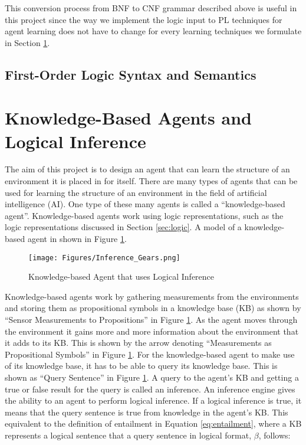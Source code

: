 This conversion process from BNF to CNF grammar described above is useful in this project since the way we implement the logic input to PL techniques for agent learning does not have to change for every learning techniques we formulate in Section \ref{sec:kb_agents_and_logical_inference}.

\subsection{First-Order Logic Syntax and Semantics}
\label{subsec: fol_logic}


\newpage

\section{Knowledge-Based Agents and Logical Inference}
\label{sec:kb_agents_and_logical_inference}

The aim of this project is to design an agent that can learn the structure of an environment it is placed in for itself. There are many types of agents that can be used for learning the structure of an environment in the field of artificial intelligence (AI). One type of these many agents is called a ``knowledge-based agent''. 
Knowledge-based agents work using logic representations, such as the logic representations discussed in Section \ref{sec:logic}.
A model of a knowledge-based agent in shown in Figure \ref{fig:kb_agent}. 

\begin{figure}[H]
    \centering
    \texttt{[image: Figures/Inference\_Gears.png]}
    \caption{Knowledge-based Agent that uses Logical Inference}
    \label{fig:kb_agent}
\end{figure}




Knowledge-based agents work by gathering measurements from the environments and storing them as propositional symbols in a knowledge base (KB) as shown by ``Sensor Measurements to Propositions'' in Figure \ref{fig:kb_agent}. As the agent moves through the environment it gains more and more information about the environment that it adds to its KB. This is shown by the arrow denoting ``Measurements as Propositional Symbols'' in Figure \ref{fig:kb_agent}. For the knowledge-based agent to make use of its knowledge base, it has to be able to query its knowledge base. This is shown as ``Query Sentence'' in Figure \ref{fig:kb_agent}. A query to the agent's KB and getting a true or false result for the query is called an inference. An inference engine gives the ability to an agent to perform logical inference. If a logical inference is true, it means that the query sentence is true from knowledge in the agent's KB. This equivalent to the definition of entailment in Equation \ref{eq:entailment}, where a KB represents a logical sentence that a query sentence in logical format, $\beta$, follows:


